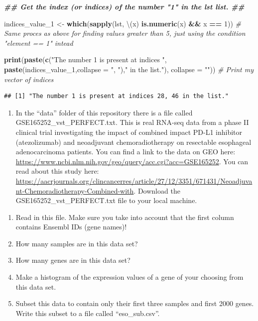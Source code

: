 \documentclass[
]{article}
\newenvironment{Shaded}{\begin{snugshade}}{\end{snugshade}}
\newcommand{\AttributeTok}[1]{\textcolor[rgb]{0.13,0.29,0.53}{#1}}
\newcommand{\CommentTok}[1]{\textcolor[rgb]{0.56,0.35,0.01}{\textit{#1}}}
\newcommand{\DecValTok}[1]{\textcolor[rgb]{0.00,0.00,0.81}{#1}}
\newcommand{\DocumentationTok}[1]{\textcolor[rgb]{0.56,0.35,0.01}{\textbf{\textit{#1}}}}
\newcommand{\FunctionTok}[1]{\textcolor[rgb]{0.13,0.29,0.53}{\textbf{#1}}}
\newcommand{\NormalTok}[1]{#1}
\newcommand{\OtherTok}[1]{\textcolor[rgb]{0.56,0.35,0.01}{#1}}
\newcommand{\SpecialCharTok}[1]{\textcolor[rgb]{0.81,0.36,0.00}{\textbf{#1}}}
\newcommand{\StringTok}[1]{\textcolor[rgb]{0.31,0.60,0.02}{#1}}
\providecommand{\tightlist}{%
  \setlength{\itemsep}{0pt}\setlength{\parskip}{0pt}}
\begin{document}
\begin{Shaded}
\begin{Highlighting}[]
\DocumentationTok{\#\# Get the index (or indices) of the number "1" in the lst list. \#\#}

\NormalTok{indices\_value\_1 }\OtherTok{\textless{}{-}} \FunctionTok{which}\NormalTok{(}\FunctionTok{sapply}\NormalTok{(lst, \textbackslash{}(x) }\FunctionTok{is.numeric}\NormalTok{(x) }\SpecialCharTok{\&\&}\NormalTok{ x }\SpecialCharTok{==} \DecValTok{1}\NormalTok{)) }\CommentTok{\# Same proces as above for finding values greater than 5, just using the condition "element == 1" intead}

\FunctionTok{print}\NormalTok{(}\FunctionTok{paste}\NormalTok{(}\FunctionTok{c}\NormalTok{(}\StringTok{"The number 1 is present at indices "}\NormalTok{, }\FunctionTok{paste}\NormalTok{(indices\_value\_1,}\AttributeTok{collapse =} \StringTok{", "}\NormalTok{),}\StringTok{" in the list."}\NormalTok{), }\AttributeTok{collapse =} \StringTok{""}\NormalTok{)) }\CommentTok{\# Print my vector of indices}
\end{Highlighting}
\end{Shaded}

\begin{verbatim}
## [1] "The number 1 is present at indices 28, 46 in the list."
\end{verbatim}

\begin{enumerate}
\def\labelenumi{\arabic{enumi})}
\setcounter{enumi}{1}
\tightlist
\item
  In the ``data'' folder of this repository there is a file called
  GSE165252\_vst\_PERFECT.txt. This is real RNA-seq data from a phase II
  clinical trial investigating the impact of combined impact PD-L1
  inhibitor (atezolizumab) and neoadjuvant chemoradiotherapy on
  resectable esophageal adenocarcinoma patients. You can find a link to
  the data on GEO here:
  \url{https://www.ncbi.nlm.nih.gov/geo/query/acc.cgi?acc=GSE165252}.
  You can read about this study here:
  \url{https://aacrjournals.org/clincancerres/article/27/12/3351/671431/Neoadjuvant-Chemoradiotherapy-Combined-with}.
  Download the GSE165252\_vst\_PERFECT.txt file to your local machine.
\end{enumerate}

\begin{enumerate}
\def\labelenumi{\alph{enumi})}
\tightlist
\item
  Read in this file. Make sure you take into account that the first
  column contains Ensembl IDs (gene names)!
\item
  How many samples are in this data set?
\item
  How many genes are in this data set?
\item
  Make a histogram of the expression values of a gene of your choosing
  from this data set.
\item
  Subset this data to contain only their first three samples and first
  2000 genes. Write this subset to a file called ``eso\_sub.csv''.
\end{enumerate}
\end{document}

